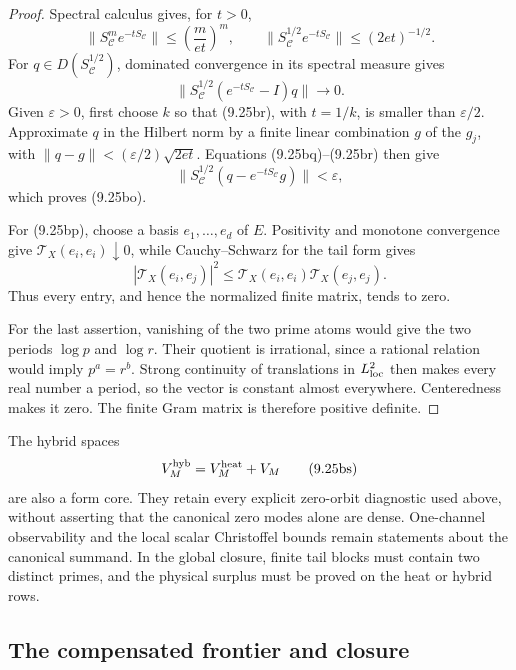 \documentclass[11pt]{amsart}
\theoremstyle{definition}
\theoremstyle{remark}
\begin{document}
\begin{proof}
Spectral calculus gives, for \(t>0\),
\[
 \|S_{\mathscr C}^{m}e^{-tS_{\mathscr C}}\|
 \le\left(\frac{m}{et}\right)^m,
 \qquad
 \|S_{\mathscr C}^{1/2}e^{-tS_{\mathscr C}}\|
 \le(2et)^{-1/2}.
\tag{9.25bq}
\]
For \(q\in D(S_{\mathscr C}^{1/2})\), dominated convergence in its spectral
measure gives
\[
 \|S_{\mathscr C}^{1/2}(e^{-tS_{\mathscr C}}-I)q\|\longrightarrow0.
\tag{9.25br}
\]
Given \(\varepsilon>0\), first choose \(k\) so that (9.25br), with
\(t=1/k\), is smaller than \(\varepsilon/2\).  Approximate \(q\) in the
Hilbert norm by a finite linear combination \(g\) of the \(g_j\), with
\(\|q-g\|<(\varepsilon/2)\sqrt{2et}\).  Equations (9.25bq)--(9.25br)
then give
\[
 \|S_{\mathscr C}^{1/2}(q-e^{-tS_{\mathscr C}}g)\|<\varepsilon,
\]
which proves (9.25bo).

For (9.25bp), choose a basis \(e_1,\ldots,e_d\) of \(E\).  Positivity and
monotone convergence give
\(\mathcal T_X(e_i,e_i)\downarrow0\), while Cauchy--Schwarz for the tail
form gives
\[
 |\mathcal T_X(e_i,e_j)|^2
 \le\mathcal T_X(e_i,e_i)\mathcal T_X(e_j,e_j).
\]
Thus every entry, and hence the normalized finite matrix, tends to zero.

For the last assertion, vanishing of the two prime atoms would give the
two periods \(\log p\) and \(\log r\).  Their quotient is irrational,
since a rational relation would imply \(p^a=r^b\).  Strong continuity of
translations in \(L^2_{\rm loc}\) then makes every real number a period,
so the vector is constant almost everywhere.  Centeredness makes it zero.
The finite Gram matrix is therefore positive definite.
\end{proof}

The hybrid spaces
\[
 V_M^{\rm hyb}=V_M^{\rm heat}+V_M
\tag{9.25bs}
\]
are also a form core.  They retain every explicit zero-orbit diagnostic
used above, without asserting that the canonical zero modes alone are
dense.  One-channel observability and the local scalar Christoffel bounds
remain statements about the canonical summand.  In the global closure,
finite tail blocks must contain two distinct primes, and the physical
surplus must be proved on the heat or hybrid rows.

\subsection{The compensated frontier and closure}
\end{document}
